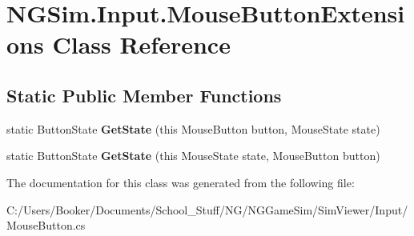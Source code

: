 \hypertarget{class_n_g_sim_1_1_input_1_1_mouse_button_extensions}{}\section{N\+G\+Sim.\+Input.\+Mouse\+Button\+Extensions Class Reference}
\label{class_n_g_sim_1_1_input_1_1_mouse_button_extensions}
\subsection*{Static Public Member Functions}
\begin{DoxyCompactItemize}
\item 
\mbox{\label{class_n_g_sim_1_1_input_1_1_mouse_button_extensions_aee7085da51d96e6583c6545daa864d70}} 
static Button\+State {\bfseries Get\+State} (this Mouse\+Button button, Mouse\+State state)
\item 
\mbox{\label{class_n_g_sim_1_1_input_1_1_mouse_button_extensions_a99c7648673f50fa9f372fc3a46672dd0}} 
static Button\+State {\bfseries Get\+State} (this Mouse\+State state, Mouse\+Button button)
\end{DoxyCompactItemize}


The documentation for this class was generated from the following file\+:\begin{DoxyCompactItemize}
\item 
C\+:/\+Users/\+Booker/\+Documents/\+School\+\_\+\+Stuff/\+N\+G/\+N\+G\+Game\+Sim/\+Sim\+Viewer/\+Input/Mouse\+Button.\+cs\end{DoxyCompactItemize}
